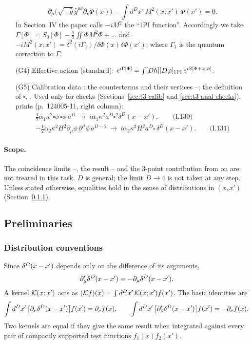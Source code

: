 \begin{itemize}[leftmargin=2.6em]
\begin{equation}
\partial_\mu\bigl(\sqrt{-\hat g}\,\hat g^{\mu\nu}\partial_\nu\Phi(x)\bigr)-\int d^Dx'\,M^2(x;x')\,\Phi(x')=0 .
\end{equation}
In Section~IV the paper calls \(-iM^2\) the ``1PI function''. Accordingly we take \tA{}
\(\Gamma[\Phi]=S_0[\Phi]-\tfrac12\iint\Phi M^2\Phi+\ldots\) and
\(-iM^2(x;x')=\delta^2(i\Gamma_1)/\delta\Phi(x)\delta\Phi(x')\), where \(\Gamma_1\) is the
quantum correction to \(\Gamma\).
\item[(G4)] Effective action \tA{} (standard):
\(e^{i\Gamma[\Phi]}=\int[Dh][D\varphi]_{\rm 1PI}\,e^{iS[\Phi+\varphi,h]}\).
\item[(G5)] Calibration data \tP: the counterterms  and their vertices
--; the definition of \(\square\), . Used only for checks
(Sections~\ref{sec:t3-calib} and \ref{sec:t3-anal-checks}). \PI{} prints (p.~124005-11,
right column):
\begin{gather*}
\tfrac12\alpha_1\kappa^2\square\phi\,\square\phi\,a^D\ \to\ i\alpha_1\kappa^2a^D\square^2\delta^D(x-x'),
\qquad\text{(I.130)}\\
-\tfrac12\alpha_2\kappa^2H^2\partial_\mu\phi\,\partial^\mu\phi\,a^{D-2}\ \to\ i\alpha_2\kappa^2H^2a^D\square\,\delta^D(x-x').
\qquad\text{(I.131)}
\end{gather*}
\end{itemize}

\paragraph{Scope.}
The coincidence limits --, the result -- and the
3-point contribution from  on are not treated in this task. \(D\) is general;
the limit \(D\to4\) is not taken at any step. Unless stated otherwise, equalities hold
in the sense of distributions in \((x,x')\) (Section~\ref{sec:t3-dist}).

\subsection{Preliminaries}

\subsubsection{Distribution conventions \texorpdfstring{\tA}{}}\label{sec:t3-dist}
Since \(\delta^D(x-x')\) depends only on the difference of its arguments,
\begin{equation}\label{eq:t3-dprime}
\partial'_\mu\delta^D(x-x')=-\partial_\mu\delta^D(x-x') .
\end{equation}
A kernel \(\mathcal K(x;x')\) acts as \((\mathcal K f)(x)=\int d^Dx'\,\mathcal K(x;x')f(x')\). The basic
identities are
\begin{equation}\label{eq:t3-ident}
\int d^Dx'\,\bigl[\partial_\nu\delta^D(x-x')\bigr]f(x')=\partial_\nu f(x),\qquad
\int d^Dx'\,\bigl[\partial'_\nu\delta^D(x-x')\bigr]f(x')=-\partial_\nu f(x).
\end{equation}
Two kernels are equal if they give the same result when integrated against every pair
of compactly supported test functions \(f_1(x)f_2(x')\).

